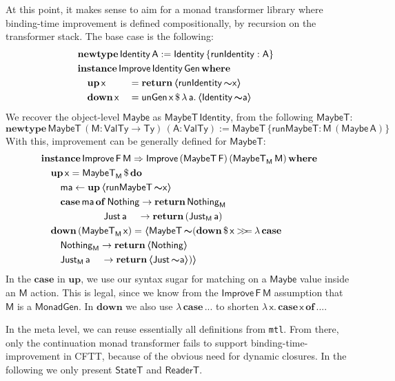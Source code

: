 \documentclass[acmsmall,screen,review,anonymous]{acmart}
\newcommand{\mit}[1]{{\mathsf{#1}}}
\newcommand{\msf}[1]{{\mathsf{#1}}}
\newcommand{\mbf}[1]{{\mathbf{#1}}}
\newcommand{\bs}[1]{\boldsymbol{#1}}
\newcommand{\mdo}{\mbf{do}\,}
\newcommand{\ind}{\hspace{1em}}
\newcommand{\return}{\mbf{return}\,}
\newcommand{\lam}{\lambda\,}
\newcommand{\where}{\mbf{where}}
\newcommand{\M}{\msf{M}}
\newcommand{\of}{\mbf{of}\,}
\newcommand{\vma}{\mathsf{ma}}
\newcommand{\vA}{\mathsf{A}}
\newcommand{\vF}{\mathsf{F}}
\newcommand{\vM}{\mathsf{M}}
\newcommand{\va}{\mathsf{a}}
\newcommand{\vx}{\mathsf{x}}
\newcommand{\ReaderT}{\msf{ReaderT}}
\newcommand{\fro}{\leftarrow}
\newcommand{\case}{\mbf{case\,}}
\newcommand{\spl}{{\bs{\sim}}}
\newcommand{\ql}{{\bs{\langle}}}
\newcommand{\qr}{{\bs{\rangle}}}
\newcommand{\bind}{\mathbin{>\!\!>\mkern-6.7mu=}}
\newcommand{\VTy}{\msf{ValTy}}
\newcommand{\Ty}{\msf{Ty}}
\newcommand{\Maybe}{\msf{Maybe}}
\newcommand{\MaybeT}{\msf{MaybeT}}
\newcommand{\Nothing}{\msf{Nothing}}
\newcommand{\Just}{\msf{Just}}
\theoremstyle{remark}
\newcommand{\mup}{\mbf{up}}
\newcommand{\mdown}{\mbf{down}}
\newcommand{\instance}{\mbf{instance}\,}
\newcommand{\Improve}{\msf{Improve}}
\newcommand{\Gen}{\msf{Gen}}
\newcommand{\unGen}{\mit{unGen}}
\newcommand{\qt}[1]{\ql#1\qr}
\newcommand{\MonadGen}{\msf{MonadGen}}
\newcommand{\RA}{\Rightarrow}
\newcommand{\StateT}{\msf{StateT}}
\newcommand{\Identity}{\msf{Identity}}
\newcommand{\runIdentity}{\mit{runIdentity}}
\newcommand{\newtype}{\mbf{newtype}\,}
\newcommand{\runMaybeT}{\mit{runMaybeT}}
\newcommand{\dlr}{\,\$\,}
\begin{document}
At this point, it makes sense to aim for a monad transformer library where
binding-time improvement is defined compositionally, by recursion on the
transformer stack. The base case is the following:
\begin{alignat*}{3}
  & \hspace{-2em}\mathrlap{\newtype \Identity\,\vA := \Identity\,\{\runIdentity : \vA\} }\\
  & \hspace{-2em}\mathrlap{\instance \Improve\,\Identity\,\Gen\,\where}\\
  & \hspace{-2em}\ind \mup\,\vx   &&= \return \qt{\runIdentity\,\spl \vx}\\
  & \hspace{-2em}\ind \mdown\,\vx &&= \unGen\,\vx \dlr \lam \va.\,\qt{\Identity\,\spl \va}
\end{alignat*}
We recover the object-level $\Maybe$ as $\MaybeT\,\Identity$, from the following $\MaybeT$:
\[ \newtype \MaybeT\,(\vM : \VTy \to \Ty)\,(\vA : \VTy) := \MaybeT\,\{\runMaybeT : \vM\,(\Maybe\,\vA)\} \]
With this, improvement can be generally defined for $\MaybeT$:
\begin{alignat*}{3}
  &\instance \Improve\,\vF\,\vM \RA \Improve\,(\MaybeT\,\vF)\,(\MaybeT_\M\,\vM)\,\where\\
  &\ind \mup\,\vx = \MaybeT_\M \dlr \mdo\\
  &\ind\ind \vma \fro \mup\,\qt{\runMaybeT\,\spl \vx}\\
  &\ind\ind \case \vma\,\of \Nothing \to \return \Nothing_\M\\
  &\hspace{6.5em}         \Just\,\va \hspace{1.15em}\to \return (\Just_\M\,\va)\\
  &\ind \mdown\,(\MaybeT_\M\,\vx) = \qt{\MaybeT\,\spl(\mdown \dlr \vx \bind \lam\case\\
  &\ind\ind\Nothing_\M \to \return \qt{\Nothing}\\
  &\ind\ind\Just_\M\,\va\hspace{1.15em} \to \return \qt{\Just\,\spl \va})}
\end{alignat*}
In the $\mbf{case}$ in $\mup$, we use our syntax sugar for matching on a
$\Maybe$ value inside an $\vM$ action. This is legal, since we know from the
$\Improve\,\vF\,\vM$ assumption that $\vM$ is a $\MonadGen$. In $\mdown$ we also use
$\lam\case ...$ to shorten $\lam \vx.\,\case \vx\,\of ...$.

In the meta level, we can reuse essentially all definitions from \texttt{mtl}.
From there, only the continuation monad transformer fails to support
binding-time-improvement in CFTT, because of the obvious need for dynamic
closures. In the following we only present $\StateT$ and $\ReaderT$.
\end{document}
